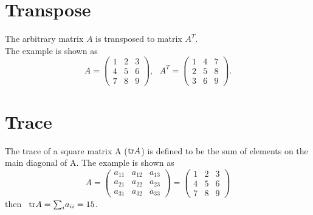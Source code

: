 \documentclass[dvipdfmx]{article}
\begin{document}
\section*{Transpose}
The arbitrary matrix $A$ is transposed to matrix $A^T$.\\
The example is shown as
\[
  A = \left(
    \begin{array}{ccc}
      1 & 2 & 3 \\
      4 & 5 & 6 \\
      7 & 8 & 9
    \end{array}
  \right) 
  , \ \ \
  A^T = \left(
    \begin{array}{ccc}
      1 & 4 & 7 \\
      2 & 5 & 8 \\
      3 & 6 & 9
    \end{array}
  \right) .
\] 


\section*{Trace}
The trace of a square matrix A (${\rm{tr}}A$) is defined to be the sum of elements on the main diagonal of A.
The example is shown as
\[
  A = 
  \left(
    \begin{array}{ccc}
      a_{11} & a_{12} & a_{13} \\
      a_{21} & a_{22} & a_{23} \\
      a_{31} & a_{32} & a_{33}
    \end{array}
  \right)  =
  \left(
    \begin{array}{ccc}
      1 & 2 & 3 \\
      4 & 5 & 6 \\
      7 & 8 & 9
    \end{array}
  \right) 
\] 
then \
${\rm{tr}}A =  {\sum_i}a_{ii} = 15$.
\end{document}
